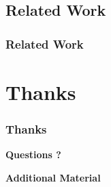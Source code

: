 \documentclass[hyperref={pdfpagelabels=false}]{beamer}
\begin{document}
\subsection{Related Work}
\begin{frame}[allowframebreaks]
    \frametitle{Related Work}
    
    
\end{frame}



\section*{Thanks}
\begin{frame}
    \frametitle{Thanks}
    \begin{center}
        \vspace{-40pt}
        \textbf{Questions ?}
    \end{center}
\end{frame}

\usebackgroundtemplate{}

\appendix
{}
\setcounter{finalframe}{\value{framenumber}}


\begin{frame}
\end{frame}


\begin{frame}
    \begin{center}
        \textbf{Additional Material}
    \end{center}
\end{frame}
\end{document}

